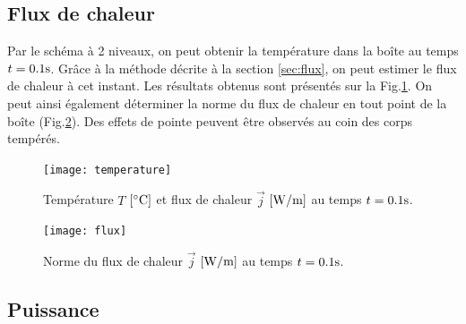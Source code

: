\documentclass[a4paper,12pt,oneside]{article}
\begin{document}
\subsection{Flux de chaleur}

Par le schéma à 2 niveaux, on peut obtenir la température dans la boîte au temps $t=0.1 \rm s$. Grâce à la méthode décrite à la section \ref{sec:flux}, on peut estimer le flux de chaleur à cet instant. Les résultats obtenus sont présentés sur la Fig.\ref{temperature}. On peut ainsi également déterminer la norme du flux de chaleur en tout point de la boîte (Fig.\ref{flux}). Des effets de pointe peuvent être observés au coin des corps tempérés.

\begin{figure}[H]
    \centering
    \texttt{[image: temperature]}
    \caption{Température $T$ $\rm [^{\circ} C]$ et flux de chaleur $\Vec{j}$ $\rm [W/m]$ au temps $t=0.1 \rm s$.}
    \label{temperature}
\end{figure}

\begin{figure}[H]
    \centering
    \texttt{[image: flux]}
    \caption{Norme du flux de chaleur $\Vec{j}$ $\rm [W/m]$ au temps $t=0.1 \rm s$.}
    \label{flux}
\end{figure}

\subsection{Puissance}
\end{document}
